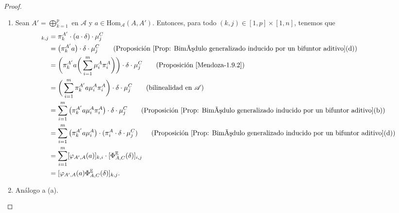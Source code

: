 \documentclass[tesis]{subfiles}
\begin{document}
\begin{proof}\leavevmode
    \begin{enumerate}[label=(\alph*)]
    
        \item Sean $A' = \bigoplus_{k=1}^p$ en $\mathscr{A}$ y $a\in\text{Hom}_\mathscr{A}(A,A')$. Entonces, para todo $(k,j)\in[1,p]\times[1,n]$, tenemos que
            \begin{align*}
                [\Phi^\mathbb{E}_{A',C}(a\cdot\delta)]_{k,j} &= \pi_k^{A'}\cdot(a\cdot\delta)\cdot\mu_j^C  \\
                                                             &= \big(\pi_k^{A'}a\big)\cdot\delta\cdot\mu_j^C \tag{Proposición \ref{Prop: Bimódulo generalizado inducido por un bifuntor aditivo}(d)}\\
                                                             &= \bigg(\pi_k^{A'}a\bigg(\sum_{i=1}^m \mu_i^A\pi_i^A\bigg)\bigg)\cdot\delta\cdot\mu_j^C \tag{Proposición \ref{Mendoza-1.9.2}} \\
                                                             &= \bigg(\sum_{i=1}^m \pi_k^{A'}a \mu_i^A\pi_i^A\bigg)\cdot\delta\cdot\mu_j^C \tag{bilinealidad en $\mathscr{A}$} \\
                                                             &= \sum_{i=1}^m\big( \pi_k^{A'}a \mu_i^A\pi_i^A\big)\cdot\delta\cdot\mu_j^C \tag{Proposición \ref{Prop: Bimódulo generalizado inducido por un bifuntor aditivo}(b)} \\
                                                             &= \sum_{i=1}^m\big( \pi_k^{A'}a \mu_i^A\big)\cdot(\pi_i^A\cdot\delta\cdot\mu_j^C) \tag{Proposición \ref{Prop: Bimódulo generalizado inducido por un bifuntor aditivo}(d)} \\
                                                             &= \sum_{i=1}^m [\varphi_{A',A}(a)]_{k,i} \cdot [\Phi^\mathbb{E}_{A,C}(\delta)]_{i,j} \\
                                                             &= [\varphi_{A',A}(a) \Phi^\mathbb{E}_{A,C}(\delta)]_{k,j}.
            \end{align*}

        \item Análogo a (a).
    \end{enumerate}
\end{proof}
\end{document}
